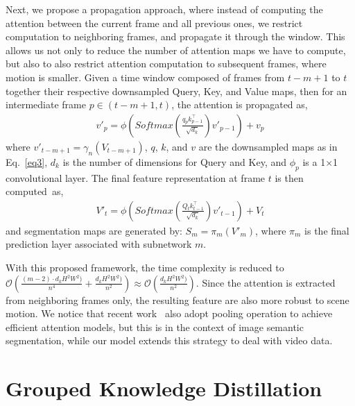 \documentclass[10pt,twocolumn,letterpaper]{article}
\makeatletter
\renewcommand{\paragraph}{\@startsection{paragraph}{4}{\z@}{2.25ex \@plus 1ex \@minus .2ex}{-1em}{\normalfont\normalsize\bfseries}}
\makeatother
\begin{document}
\paragraph{Attention Propagation.} 
Next, we propose a propagation approach, where instead of computing the attention between the current frame and all previous ones, we restrict computation to neighboring frames, and propagate it through the window. 
This allows us not only to reduce the number of attention maps we have to compute, but also to also restrict attention computation to subsequent frames, where motion is smaller. 
Given a time window composed of frames from $t-m+1$ to $t$ together their respective downsampled Query, Key, and Value maps, then for an intermediate frame $p\in(t-m+1,t)$, the attention is propagated as,
\begin{equation}
\label{eq4}
\begin{split}
v'_{p} = \phi\left(Softmax(\frac{q_p  k_{p-1}^{\top}}{\sqrt{d_k}}) v'_{p-1} \right) +v_p 
\end{split}
\end{equation}
where $v'_{t-m+1}=\gamma_n(V_{t-m+1})$, $q$, $k$, and $v$ are the downsampled maps as in Eq.~\ref{eq3},  $d_k$ is the number of dimensions for Query and Key, and $\phi_p$ is a 1$\times$1 convolutional layer.
The final feature representation at frame $t$ is then computed~as,
\begin{equation}
\label{eq5}
\begin{split}
V'_{t}= \phi\left(Softmax(\frac{Q_t k_{t-1}^{\top}}{\sqrt{d_k}}) v'_{t-1}\right) + V_{t}
\end{split}
\end{equation}
and segmentation maps are generated by: $S_{m}= \pi_m(V'_m)$, where $\pi_m$ is the final prediction layer associated with subnetwork $m$.

With this proposed framework, the time complexity is reduced to $\mathcal{O}( \frac{(m-2)\cdot d_k H^2W^2)}{n^4} + \frac{d_k H^2W^2)}{n^2}) \approx \mathcal{O}( \frac{d_k H^2W^2)}{n^2})$. 
Since the attention is extracted from neighboring frames only, the resulting feature are also more robust to scene motion. 
We notice that recent work~\cite{Zhu_2019_ICCV} also adopt pooling operation to achieve efficient attention models, but this is in the context of image semantic segmentation, while our model extends this strategy to deal with video data.

\section{Grouped Knowledge Distillation} 
\label{sec_gkd}
\end{document}
